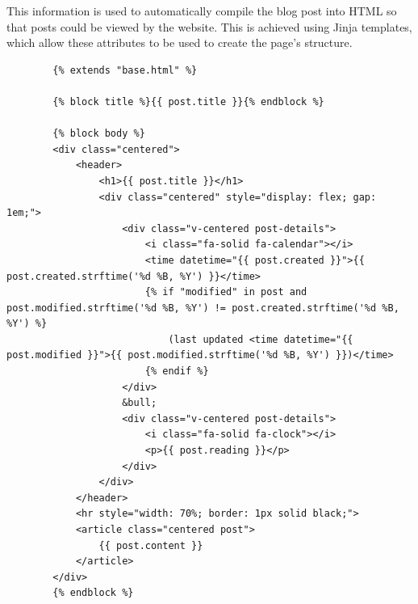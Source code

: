 \documentclass[titlepage]{article}
\begin{document}
        This information is used to automatically compile the blog post into
        HTML so that posts could be viewed by the website. This is achieved
        using Jinja templates, which allow these attributes to be used to create
        the page's structure.
        \begin{verbatim}
        {% extends "base.html" %}

        {% block title %}{{ post.title }}{% endblock %}

        {% block body %}
        <div class="centered">
            <header>
                <h1>{{ post.title }}</h1>
                <div class="centered" style="display: flex; gap: 1em;">
                    <div class="v-centered post-details">
                        <i class="fa-solid fa-calendar"></i>
                        <time datetime="{{ post.created }}">{{ post.created.strftime('%d %B, %Y') }}</time>
                        {% if "modified" in post and post.modified.strftime('%d %B, %Y') != post.created.strftime('%d %B, %Y') %}
                            (last updated <time datetime="{{ post.modified }}">{{ post.modified.strftime('%d %B, %Y') }})</time>
                        {% endif %}
                    </div>
                    &bull;
                    <div class="v-centered post-details">
                        <i class="fa-solid fa-clock"></i>
                        <p>{{ post.reading }}</p>
                    </div>
                </div>
            </header>
            <hr style="width: 70%; border: 1px solid black;">
            <article class="centered post">
                {{ post.content }}
            </article>
        </div>
        {% endblock %}
        \end{verbatim}
\end{document}
